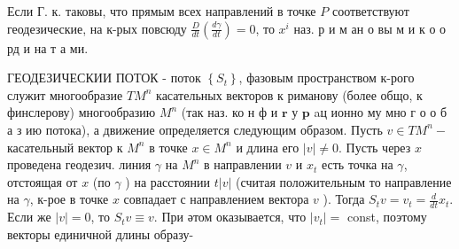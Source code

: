 \documentclass[10pt]{article}
\begin{document}
Если Г. к. таковы, что прямым всех направлений в точке $P$ соответствуют геодезические, на к-рых повсюду $\frac{D}{d t}\left(\frac{d \gamma}{d t}\right)=0$, то $x^{i}$ наз. р и м ан о вы м и к о о рд и на т а ми.



ГЕОДЕЗИЧЕСКИИ ПОТОК - поток $\left\{S_{t}\right\}$, фазовым пространством к-рого служит многообразие $T M^{n}$ касательных векторов к риманову (более общо, к финслерову) многообразию $M^{n}$ (так наз. ко н ф и $\mathbf{r}$ у $\mathbf{p}$ aц ионно му мно г о о б а з ию потока), а движение определяется следующим образом. Пусть $v \in T M^{n}-$ касательный вектор к $M^{n}$ в точке $x \in M^{n}$ и длина его $|v| \neq 0$. Пусть через $x$ проведена геодезич. линия $\gamma$ на $M^{n}$ в направлении $v$ и $x_{t}$ есть точка на $\gamma$, отстоящая от $x$ (по $\gamma$ ) на расстоянии $t|v|$ (считая положительным то направление на $\gamma$, к-рое в точке $x$ совпадает с направлением вектора $v$ ). Тогда $S_{t} v=v_{t}=\frac{d}{d t} x_{t}$. Если же $|v|=0$, то $S_{t} v \equiv v$. При әтом оказывается, что $\left|v_{t}\right|=$ const, поэтому векторы единичной длины образу-
\end{document}
